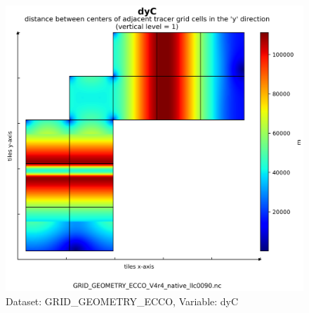 \begin{figure}[H]
\centering
\includegraphics[scale=0.55]{../images/plots/v4r4/native_plots_coords/Geometry_Parameters_for_the_Lat-Lon-Cap_90_(llc90)_Native_Model_Grid_(Version_4_Release_4)/dyC.png}
\caption{Dataset: GRID\_GEOMETRY\_ECCO, Variable: dyC}
\label{tab:table-GRID_GEOMETRY_ECCO_dyC-Plot}
\end{figure}
\newpage
\pagebreak
